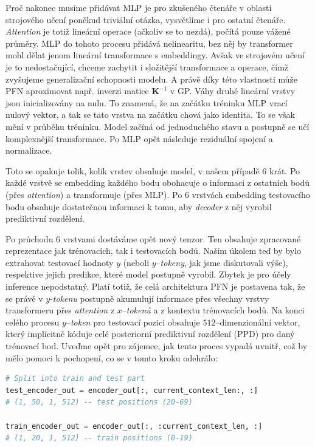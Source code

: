 Proč nakonec musíme přidávat MLP je pro zkušeného čtenáře v oblasti strojového učení poněkud triviální otázka, vysvětlíme i pro ostatní čtenáře.
\emph{Attention} je totiž lineární operace (ačkoliv se to nezdá), počítá pouze vážené průměry.
MLP do tohoto procesu přidává nelinearitu, bez něj by transformer mohl dělat jenom lineární transformace s embeddingy.
Avšak ve strojovém učení je to nedostačující, chceme zachytit i složitější transformace a operace, čímž zvyšujeme generalizační schopnosti modelu.
A právě díky této vlastnosti může PFN aproximovat např. inverzi matice $\mathbf{K}^{-1}$ v GP.
Váhy druhé lineární vrstvy jsou inicializovány na nulu.
To znamená, že na začátku tréninku MLP vrací nulový vektor, a tak se tato vrstva na začátku chová jako identita.
To se však mění v průběhu tréninku.
Model začíná od jednoduchého stavu a postupně se učí komplexnější transformace.
Po MLP opět následuje reziduální spojení a normalizace.
\par 

Toto se opakuje tolik, kolik vrstev obsahuje model, v našem případě $6$ krát.
Po každé vrstvě se embedding každého bodu obohacuje o informaci z ostatních bodů (přes \emph{attention}) a transformuje (přes MLP). 
Po $6$ vrstvách embedding testovacího bodu obsahuje dostatečnou informaci k tomu, aby \emph{decoder} z něj vyrobil prediktivní rozdělení.
\par   

Po průchodu $6$ vrstvami dostáváme opět nový tenzor.
Ten obsahuje zpracované reprezentace jak trénovacích, tak i testovacích bodů.
Naším úkolem teď by bylo extrahovat testovací hodnoty $y$ (neboli $y$–\emph{tokeny}, jak jsme diskutovali výše), respektive jejich predikce, které model postupně vyrobil.
Zbytek je pro účely inference nepodstatný.
Platí totiž, že celá architektura PFN je postavena tak, že se právě v $y$-\emph{tokenu} postupně akumulují informace přes všechny vrstvy transformeru přes \emph{attention} z $x$–\emph{tokenů} a z kontextu trénovacích bodů.
Na konci celého procesu $y$–\emph{token} pro testovací pozici obsahuje $512$–dimenzionální vektor, který implicitně kóduje celé posteriorní prediktivní rozdělení (PPD) pro daný trénovací bod.
Uveďme opět pro zájemce, jak tento proces vypadá uvnitř, což by mělo pomoci k pochopení, co se v tomto kroku odehrálo:
\begin{lstlisting}[language=Python]
# Split into train and test part
test_encoder_out = encoder_out[:, current_context_len:, :]
# (1, 50, 1, 512) -- test positions (20-69)

train_encoder_out = encoder_out[:, :current_context_len, :]
# (1, 20, 1, 512) -- train positions (0-19)
\end{lstlisting}

